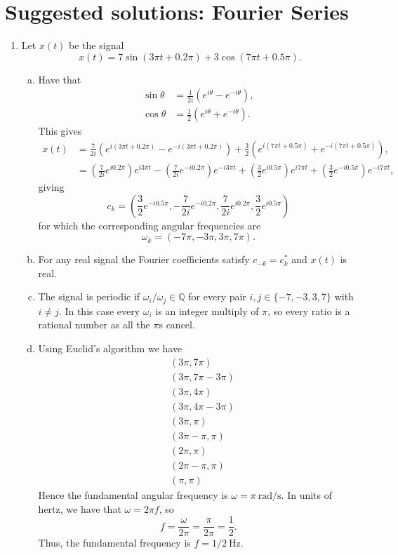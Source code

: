 \newpage
\section{Suggested solutions: Fourier Series}

\begin{enumerate}
\item Let $x(t)$ be the signal 
$$x(t)=7\sin(3\pi t+0.2\pi)+3\cos(7\pi t+0.5\pi).$$

\begin{enumerate}[a)]
\item Have that
\begin{align*}
    \sin\theta&=\frac{1}{2i}(e^{i\theta}-e^{-i\theta}), \\
    \cos\theta&=\frac{1}{2}(e^{i\theta}+e^{-i\theta}).
\end{align*}
This gives
\begin{align*}
    x(t)&=\frac{7}{2i}(e^{i(3\pi t+0.2\pi)}-e^{-i(3\pi t+0.2\pi)})+ \frac{3}{2}(e^{i(7\pi t+0.5\pi)}+e^{-i(7\pi t+0.5\pi)}), \\
    &=\left(\frac{7}{2i}e^{i0.2\pi}\right)e^{i3\pi t}-\left(\frac{7}{2i}e^{-i0.2\pi}\right)e^{-i3\pi t} + \left(\frac{3}{2}e^{i0.5\pi}\right)e^{i7\pi t}+\left(\frac{3}{2}e^{-i0.5\pi}\right)e^{-i7\pi t},
\end{align*}
giving
$$c_{k}=\left(\frac{3}{2}e^{-i0.5\pi},-\frac{7}{2i}e^{-i0.2\pi},\frac{7}{2i}e^{i0.2\pi},\frac{3}{2}e^{i0.5\pi}\right)$$
for which the corresponding angular frequencies are
$$\omega_{k}=(-7\pi,-3\pi,3\pi,7\pi).$$

\item For any real signal the Fourier coefficients satisfy $c_{-k}=c_{k}^{*}$ and $x(t)$ is real. 

\item The signal is periodic if $\omega_{i}/\omega_{j}\in\mathbb{Q}$ for every pair $i,j\in \{-7,-3,3,7\}$ with $i\neq j$. In this case every $\omega_{i}$ is an integer multiply of $\pi$, so every ratio is a rational number as all the $\pi$s cancel.

\item Using Euclid's algorithm we have
\begin{align*}
    &(3\pi,7\pi) \\
    &(3\pi,7\pi-3\pi) \\
    &(3\pi,4\pi) \\
    &(3\pi,4\pi-3\pi) \\
    &(3\pi,\pi) \\
    &(3\pi-\pi,\pi) \\
    &(2\pi,\pi) \\
    &(2\pi-\pi,\pi) \\
    &(\pi,\pi)
\end{align*}
Hence the fundamental angular frequency is $\omega=\pi\ \text{rad/s}$. In units of hertz, we have that $\omega=2\pi f$, so
$$f=\frac{\omega}{2\pi}=\frac{\pi}{2\pi}=\frac{1}{2}.$$
Thus, the fundamental frequency is $f=1/2\ \text{Hz}$. 


\end{enumerate}
\end{enumerate}

